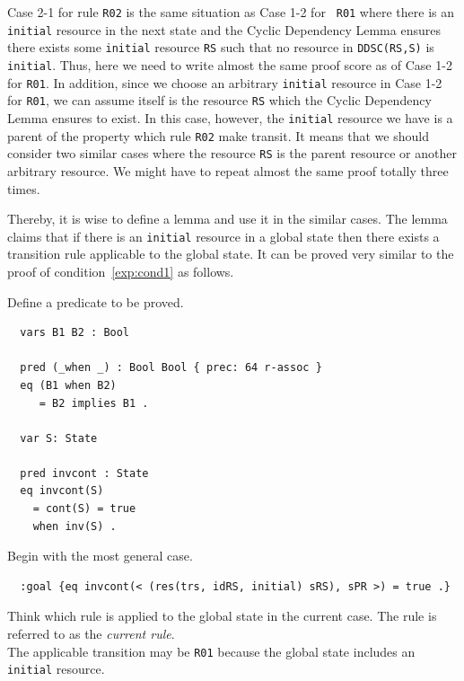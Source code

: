 \documentclass[12pt]{report}
\newcommand{\stt}[1]{{\small{\tt {#1}}}}
\begin{document}
Case 2-1 for rule {\tt R02} is the same situation as Case 1-2 for {\tt
  R01} where there is an {\tt initial} resource in the next state and
the Cyclic Dependency Lemma ensures there exists some {\tt initial}
resource {\tt RS} such that no resource in \stt{DDSC(RS,S)} is {\tt
  initial}. Thus, here we need to write almost the same proof score as
of Case 1-2 for {\tt R01}. In addition, since we choose an arbitrary
{\tt initial} resource in Case 1-2 for {\tt R01}, we can assume itself
is the resource {\tt RS} which the Cyclic Dependency Lemma ensures to
exist. In this case, however, the {\tt initial} resource we have is
a parent of the property which rule {\tt R02} make transit. It means
that we should consider two similar cases where the resource {\tt RS}
is the parent resource or another arbitrary resource. We might have 
to repeat almost the same proof totally three times.

Thereby, it is wise to define a lemma and use it in the similar cases.
The lemma claims that if there is an {\tt initial} resource in a
global state then there exists a transition rule applicable to the
global state. It can be proved very similar to the proof of
condition~\ref{exp:cond1} as follows.

 Define a predicate to be proved.
\small
\begin{verbatim}
  vars B1 B2 : Bool

  pred (_when _) : Bool Bool { prec: 64 r-assoc }
  eq (B1 when B2)
     = B2 implies B1 .

  var S: State

  pred invcont : State
  eq invcont(S) 
    = cont(S) = true
    when inv(S) .
\end{verbatim}
\normalsize
 Begin with the most general case.
\small
\begin{verbatim}
  :goal {eq invcont(< (res(trs, idRS, initial) sRS), sPR >) = true .}
\end{verbatim}
\normalsize
 Think which rule is applied to the global
state in the current case. The rule is referred to as the {\it current
rule}.\\
The applicable transition may be {\tt R01} because the global state
includes an {\tt initial} resource.\\
\end{document}
